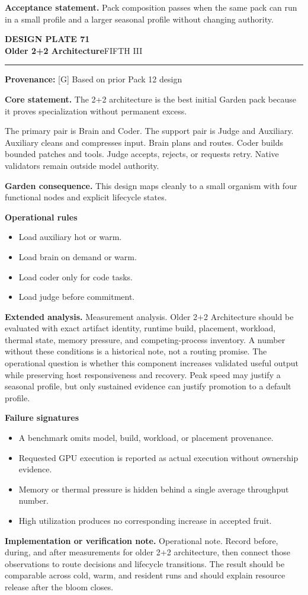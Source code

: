 \documentclass[10pt,letterpaper,oneside]{article}
\newcommand{\prov}[1]{\textcolor{gardenBlue}{\sffamily\footnotesize\textbf{Provenance:} #1}}
\newcommand{\platetitle}[3]{%
  \begin{minipage}[t][0.54in][t]{\textwidth}
  {\sffamily\bfseries\color{gardenDeep}\fontsize{9}{10}\selectfont DESIGN PLATE #1}\\[-1pt]
  {\sffamily\bfseries\color{gardenInk}\fontsize{16.5}{18}\selectfont #2}\hfill{\sffamily\color{gardenGreen}\large #3}
  \end{minipage}\vspace{-2pt}\hrule\vspace{5pt}}
\begin{document}
\begin{acceptbox}
\textbf{Acceptance statement.} Pack composition passes when the same pack can run in a small profile and a larger seasonal profile without changing authority.
\end{acceptbox}
\newpage
\platetitle{71}{Older 2+2 Architecture}{FIFTH III}
\prov{[G] Based on prior Pack 12 design}
\fontsize{8.85}{10.45}\selectfont
\begin{corebox}
\textbf{Core statement.} The 2+2 architecture is the best initial Garden pack because it proves specialization without permanent excess.
\end{corebox}
The primary pair is Brain and Coder. The support pair is Judge and Auxiliary. Auxiliary cleans and compresses input. Brain plans and routes. Coder builds bounded patches and tools. Judge accepts, rejects, or requests retry. Native validators remain outside model authority.

\textbf{Garden consequence.} This design maps cleanly to a small organism with four functional nodes and explicit lifecycle states.

\textbf{Operational rules}
\begin{itemize}
\item Load auxiliary hot or warm.
\item Load brain on demand or warm.
\item Load coder only for code tasks.
\item Load judge before commitment.
\end{itemize}
\textbf{Extended analysis.} Measurement analysis. Older 2+2 Architecture should be evaluated with exact artifact identity, runtime build, placement, workload, thermal state, memory pressure, and competing-process inventory. A number without these conditions is a historical note, not a routing promise. The operational question is whether this component increases validated useful output while preserving host responsiveness and recovery. Peak speed may justify a seasonal profile, but only sustained evidence can justify promotion to a default profile.

\textbf{Failure signatures}
\begin{itemize}
\item A benchmark omits model, build, workload, or placement provenance.
\item Requested GPU execution is reported as actual execution without ownership evidence.
\item Memory or thermal pressure is hidden behind a single average throughput number.
\item High utilization produces no corresponding increase in accepted fruit.
\end{itemize}
\textbf{Implementation or verification note.} Operational note. Record before, during, and after measurements for older 2+2 architecture, then connect those observations to route decisions and lifecycle transitions. The result should be comparable across cold, warm, and resident runs and should explain resource release after the bloom closes.
\end{document}
